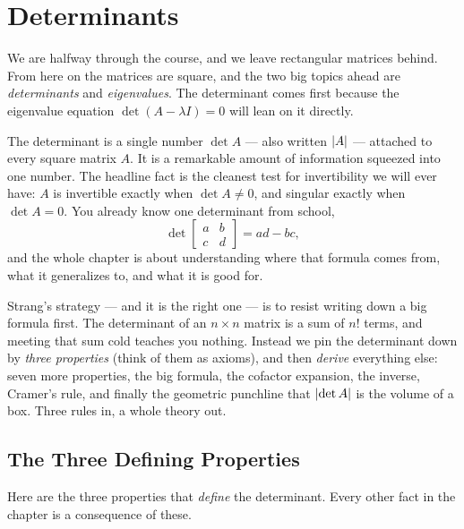 \chapter{Determinants}
\label{ch:6}

We are halfway through the course, and we leave rectangular matrices behind. From here on the matrices are square, and the two big topics ahead are \emph{determinants} and \emph{eigenvalues}. The determinant comes first because the eigenvalue equation $\det(A-\lambda I)=0$ will lean on it directly.

The determinant is a single number $\det A$ --- also written $\left|A\right|$ --- attached to every square matrix $A$. It is a remarkable amount of information squeezed into one number. The headline fact is the cleanest test for invertibility we will ever have: $A$ is invertible exactly when $\det A\ne 0$, and singular exactly when $\det A=0$. You already know one determinant from school,
\[
\det\begin{bmatrix} a & b \\ c & d\end{bmatrix}=ad-bc ,
\]
and the whole chapter is about understanding where that formula comes from, what it generalizes to, and what it is good for.

Strang's strategy --- and it is the right one --- is to resist writing down a big formula first. The determinant of an $n\times n$ matrix is a sum of $n!$ terms, and meeting that sum cold teaches you nothing. Instead we pin the determinant down by \emph{three properties} (think of them as axioms), and then \emph{derive} everything else: seven more properties, the big formula, the cofactor expansion, the inverse, Cramer's rule, and finally the geometric punchline that $\left|\det A\right|$ is the volume of a box. Three rules in, a whole theory out.

\section{The Three Defining Properties}

Here are the three properties that \emph{define} the determinant. Every other fact in the chapter is a consequence of these.

